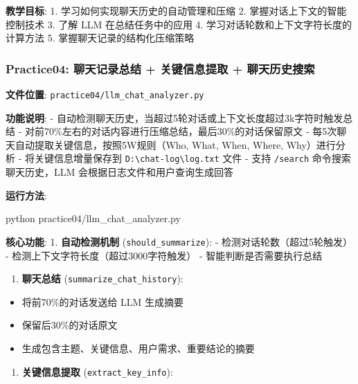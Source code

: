 \documentclass[]{article}
\newenvironment{Shaded}{}{}
\newcommand{\ExtensionTok}[1]{#1}
\newcommand{\NormalTok}[1]{#1}
\providecommand{\tightlist}{%
  \setlength{\itemsep}{0pt}\setlength{\parskip}{0pt}}
\begin{document}
\textbf{教学目标}: 1. 学习如何实现聊天历史的自动管理和压缩 2.
掌握对话上下文的智能控制技术 3. 了解 LLM 在总结任务中的应用 4.
学习对话轮数和上下文字符长度的计算方法 5. 掌握聊天记录的结构化压缩策略

\subsubsection{Practice04: 聊天记录总结 + 关键信息提取 +
聊天历史搜索}\label{practice04-ux804aux5929ux8bb0ux5f55ux603bux7ed3-ux5173ux952eux4fe1ux606fux63d0ux53d6-ux804aux5929ux5386ux53f2ux641cux7d22}

\textbf{文件位置}: \texttt{practice04/llm\_chat\_analyzer.py}

\textbf{功能说明}: -
自动检测聊天历史，当超过5轮对话或上下文长度超过3k字符时触发总结 -
对前70\%左右的对话内容进行压缩总结，最后30\%的对话保留原文 -
每5次聊天自动提取关键信息，按照5W规则（Who, What, When, Where,
Why）进行分析 - 将关键信息增量保存到
\texttt{D:\textbackslash{}chat-log\textbackslash{}log.txt} 文件 - 支持
\texttt{/search} 命令搜索聊天历史，LLM 会根据日志文件和用户查询生成回答

\textbf{运行方法}:

\begin{Shaded}
\begin{Highlighting}[]
\ExtensionTok{python}\NormalTok{ practice04/llm_chat_analyzer.py}
\end{Highlighting}
\end{Shaded}

\textbf{核心功能}: 1. \textbf{自动检测机制}
(\texttt{should\_summarize}): - 检测对话轮数（超过5轮触发） -
检测上下文字符长度（超过3000字符触发） - 智能判断是否需要执行总结

\begin{enumerate}
\def\labelenumi{\arabic{enumi}.}
\setcounter{enumi}{1}
\tightlist
\item
  \textbf{聊天总结} (\texttt{summarize\_chat\_history}):
\end{enumerate}

\begin{itemize}
\tightlist
\item
  将前70\%的对话发送给 LLM 生成摘要
\item
  保留后30\%的对话原文
\item
  生成包含主题、关键信息、用户需求、重要结论的摘要
\end{itemize}

\begin{enumerate}
\def\labelenumi{\arabic{enumi}.}
\setcounter{enumi}{2}
\tightlist
\item
  \textbf{关键信息提取} (\texttt{extract\_key\_info}):
\end{enumerate}
\end{document}

